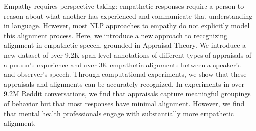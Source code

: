 Empathy requires perspective-taking: empathetic responses require a person to reason about what another has experienced and communicate that understanding in language. However, most NLP approaches to empathy do not explicitly model this alignment process. Here, we introduce a new approach to recognizing alignment in empathetic speech, grounded in Appraisal Theory. We introduce a new dataset of over 9.2K span-level annotations of different types of appraisals of a person's experience and over 3K empathetic alignments between a speaker's and observer's speech. Through computational experiments, we show that these appraisals and alignments can be accurately recognized. In experiments in over 9.2M Reddit conversations, we find that appraisals capture meaningful groupings of behavior but that most responses have minimal alignment. However, we find that mental health professionals engage with substantially more empathetic alignment.